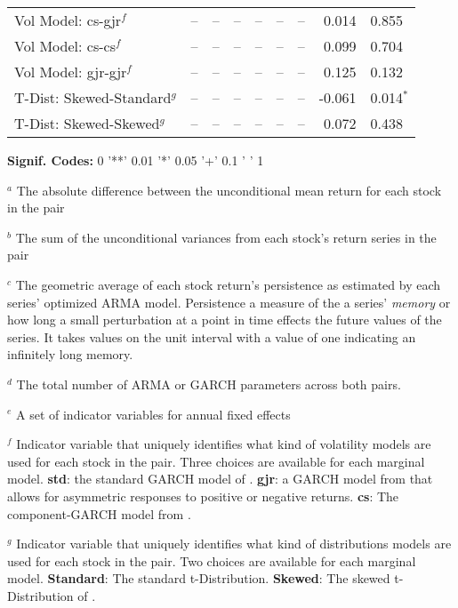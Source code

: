 \documentclass[12pt]{report}
\begin{document}
\begin{table}[!ht]
\begin{tabular}{l r l r l r l r l}
        Vol Model: cs-gjr$^{f}$            &      -- & --           &      -- & --            &          -- & --             &   0.014 & 0.855          \\
        Vol Model: cs-cs$^{f}$             &      -- & --           &      -- & --            &          -- & --             &   0.099 & 0.704          \\
        Vol Model: gjr-gjr$^{f}$           &      -- & --           &      -- & --            &          -- & --             &   0.125 & 0.132          \\
        T-Dist: Skewed-Standard$^{g}$      &      -- & --           &      -- & --            &          -- & --             &  -0.061 & 0.014$^{*}$    \\
        T-Dist: Skewed-Skewed$^{g}$        &      -- & --           &      -- & --            &          -- & --             &   0.072 & 0.438          \\
        \midrule
    \end{tabular}
    \begin{tablenotes}
        \item{\footnotesize \textbf{Signif. Codes:} 0 '**' 0.01 '*' 0.05 '+' 0.1 ' ' 1}
        \item {$^{a}$ The absolute difference between the unconditional mean return for each stock in the pair}
        \item {$^{b}$ The sum of the unconditional variances from each stock's return series in the pair}
        \item {$^{c}$ The geometric average of each stock return's persistence as estimated by each series' optimized ARMA model. Persistence a measure of the a series' \textit{memory} or how long a small perturbation at a point in time effects the future values of the series. It takes values on the unit interval with a value of one indicating an infinitely long memory.}
        \item {$^{d}$ The total number of ARMA or GARCH parameters across both pairs.}
        \item {$^{e}$ A set of indicator variables for annual fixed effects}
        \item {$^{f}$ Indicator variable that uniquely identifies what kind of volatility models are used for each stock in the pair. Three choices are available for each marginal model. \textbf{std}: the standard GARCH model of \cite{Bollerslev1986Garch}. \textbf{gjr}: a GARCH model from \cite{GJR1993Garch} that allows for asymmetric responses to positive or negative returns. \textbf{cs}: The component-GARCH model from \cite{EngleLee1993APA}.}
        \item {$^{g}$ Indicator variable that uniquely identifies what kind of distributions models are used for each stock in the pair. Two choices are available for each marginal model. \textbf{Standard}: The standard t-Distribution. \textbf{Skewed}: The skewed t-Distribution of \cite{FernandezSteel1998}.}
    \end{tablenotes}
    \label{tbl:correlation_to_log_dtw_regression}
\end{table}
\end{document}

